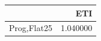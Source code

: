 \begin{tabular}{lr}
\toprule
 & ETI \\
\midrule
Prog,Flat25 & 1.040000 \\
\bottomrule
\end{tabular}
